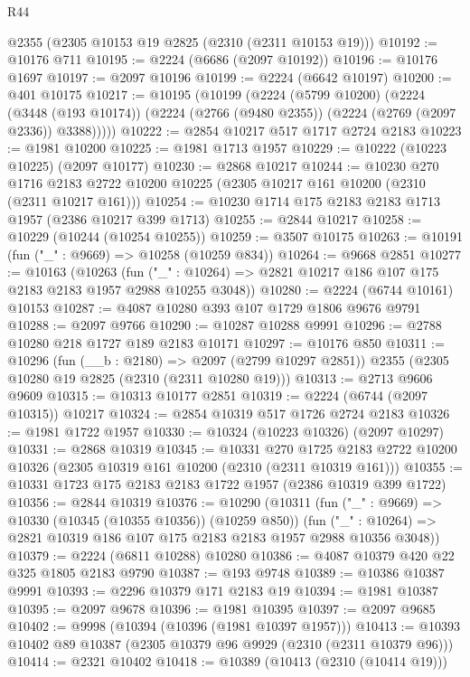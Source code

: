 \begin{lexlean}{R44}
\begin{coremodule}
    @2355
    (@2305 @10153 @19 @2825 (@2310 (@2311 @10153 @19)))
@10192 := @10176 @711
@10195 := @2224 (@6686 (@2097 @10192))
@10196 := @10176 @1697
@10197 := @2097 @10196
@10199 := @2224 (@6642 @10197)
@10200 := @401 @10175
@10217 := @10195
    (@10199
      (@2224
        (@5799 @10200)
        (@2224
          (@3448 (@193 @10174))
          (@2224 (@2766 (@9480 @2355)) (@2224 (@2769 (@2097 @2336)) @3388)))))
@10222 := @2854 @10217 @517 @1717 @2724 @2183
@10223 := @1981 @10200
@10225 := @1981 @1713 @1957
@10229 := @10222 (@10223 @10225) (@2097 @10177)
@10230 := @2868 @10217
@10244 := @10230
    @270
    @1716
    @2183
    @2722
    @10200
    @10225
    (@2305 @10217 @161 @10200 (@2310 (@2311 @10217 @161)))
@10254 := @10230 @1714 @175 @2183 @2183 @1713 @1957 (@2386 @10217 @399 @1713)
@10255 := @2844 @10217
@10258 := @10229 (@10244 (@10254 @10255))
@10259 := @3507 @10175
@10263 := @10191 (fun ("_" : @9669) => @10258 (@10259 @834))
@10264 := @9668 @2851
@10277 := @10163
    (@10263
      (fun ("_" : @10264) => @2821 @10217 @186 @107 @175 @2183 @2183 @1957 @2988 @10255 @3048))
@10280 := @2224 (@6744 @10161) @10153
@10287 := @4087 @10280 @393 @107 @1729 @1806 @9676 @9791
@10288 := @2097 @9766
@10290 := @10287 @10288 @9991
@10296 := @2788 @10280 @218 @1727 @189 @2183 @10171
@10297 := @10176 @850
@10311 := @10296
    (fun (__b : @2180) => @2097 (@2799 @10297 @2851))
    @2355
    (@2305 @10280 @19 @2825 (@2310 (@2311 @10280 @19)))
@10313 := @2713 @9606 @9609
@10315 := @10313 @10177 @2851
@10319 := @2224 (@6744 (@2097 @10315)) @10217
@10324 := @2854 @10319 @517 @1726 @2724 @2183
@10326 := @1981 @1722 @1957
@10330 := @10324 (@10223 @10326) (@2097 @10297)
@10331 := @2868 @10319
@10345 := @10331
    @270
    @1725
    @2183
    @2722
    @10200
    @10326
    (@2305 @10319 @161 @10200 (@2310 (@2311 @10319 @161)))
@10355 := @10331 @1723 @175 @2183 @2183 @1722 @1957 (@2386 @10319 @399 @1722)
@10356 := @2844 @10319
@10376 := @10290
    (@10311
      (fun ("_" : @9669) => @10330 (@10345 (@10355 @10356)) (@10259 @850))
      (fun ("_" : @10264) => @2821 @10319 @186 @107 @175 @2183 @2183 @1957 @2988 @10356 @3048))
@10379 := @2224 (@6811 @10288) @10280
@10386 := @4087 @10379 @420 @22 @325 @1805 @2183 @9790
@10387 := @193 @9748
@10389 := @10386 @10387 @9991
@10393 := @2296 @10379 @171 @2183 @19
@10394 := @1981 @10387
@10395 := @2097 @9678
@10396 := @1981 @10395
@10397 := @2097 @9685
@10402 := @9998 (@10394 (@10396 (@1981 @10397 @1957)))
@10413 := @10393 @10402 @89 @10387 (@2305 @10379 @96 @9929 (@2310 (@2311 @10379 @96)))
@10414 := @2321 @10402
@10418 := @10389 (@10413 (@2310 (@10414 @19)))

\end{coremodule}
\end{lexlean}
